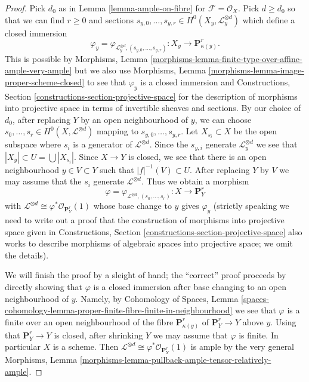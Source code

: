 \begin{proof}
Pick $d_0$ as in Lemma \ref{lemma-ample-on-fibre} for
$\mathcal{F} = \mathcal{O}_X$. Pick $d \geq d_0$
so that we can find $r \geq 0$ and sections
$s_{y, 0}, \ldots, s_{y, r} \in H^0(X_y, \mathcal{L}_y^{\otimes d})$
which define a closed immersion
$$
\varphi_y =
\varphi_{\mathcal{L}_y^{\otimes d}, (s_{y, 0}, \ldots, s_{y, r})} :
X_y \to \mathbf{P}^r_{\kappa(y)}.
$$
This is possible by Morphisms, Lemma
\ref{morphisms-lemma-finite-type-over-affine-ample-very-ample}
but we also use
Morphisms, Lemma \ref{morphisms-lemma-image-proper-scheme-closed}
to see that $\varphi_y$ is a closed immersion and
Constructions, Section \ref{constructions-section-projective-space}
for the description of morphisms into projective
space in terms of invertible sheaves and sections.
By our choice of $d_0$, after replacing $Y$ by an open neighbourhood
of $y$, we can choose
$s_0, \ldots, s_r \in H^0(X, \mathcal{L}^{\otimes d})$
mapping to $s_{y, 0}, \ldots, s_{y, r}$.
Let $X_{s_i} \subset X$ be the open subspace where $s_i$
is a generator of $\mathcal{L}^{\otimes d}$. Since
the $s_{y, i}$ generate $\mathcal{L}_y^{\otimes d}$ we see that
$|X_y| \subset U = \bigcup |X_{s_i}|$. Since $X \to Y$ is closed,
we see that there is an open neighbourhood $y \in V \subset Y$
such that $|f|^{-1}(V) \subset U$. After replacing $Y$ by $V$ we may
assume that the $s_i$ generate $\mathcal{L}^{\otimes d}$. Thus we
obtain a morphism
$$
\varphi = \varphi_{\mathcal{L}^{\otimes d}, (s_0, \ldots, s_r)} :
X \longrightarrow \mathbf{P}^r_Y
$$
with $\mathcal{L}^{\otimes d} \cong \varphi^*\mathcal{O}_{\mathbf{P}^r_Y}(1)$
whose base change to $y$ gives $\varphi_y$ (strictly speaking we need
to write out a proof that the construction of morphisms into projective
space given in
Constructions, Section \ref{constructions-section-projective-space}
also works to describe morphisms of algebraic spaces into projective
space; we omit the details).

\medskip\noindent
We will finish the proof by a sleight of hand; the ``correct'' proof
proceeds by directly showing that $\varphi$ is a closed
immersion after base changing to an open neighbourhood of $y$.
Namely, by
Cohomology of Spaces, Lemma
\ref{spaces-cohomology-lemma-proper-finite-fibre-finite-in-neighbourhood}
we see that $\varphi$ is a finite over an open neighbourhood
of the fibre $\mathbf{P}^r_{\kappa(y)}$ of $\mathbf{P}^r_Y \to Y$
above $y$. Using that $\mathbf{P}^r_Y \to Y$ is closed, after
shrinking $Y$ we may assume that $\varphi$ is finite.
In particular $X$ is a scheme.
Then $\mathcal{L}^{\otimes d} \cong \varphi^*\mathcal{O}_{\mathbf{P}^r_Y}(1)$
is ample by the very general
Morphisms, Lemma \ref{morphisms-lemma-pullback-ample-tensor-relatively-ample}.
\end{proof}








